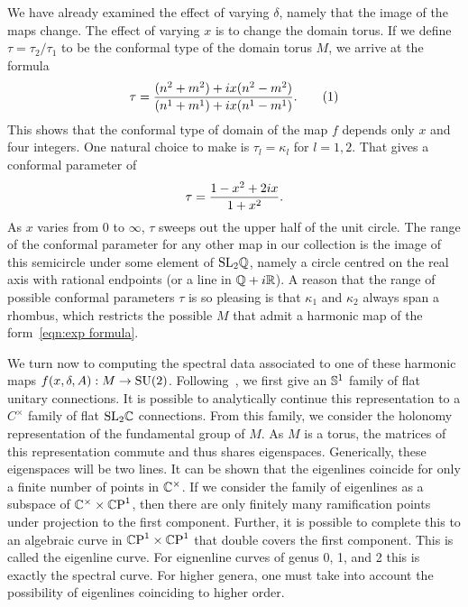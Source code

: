\documentclass{article}
\begin{document}
We have already examined the effect of varying $\delta$, namely that the image of the maps change. The effect of varying $x$ is to change the domain torus. If we define $\tau = \tau_2/\tau_1$ to be the conformal type of the domain torus $M$, we arrive at the formula
\[
\tau
= \frac{(n^2 + m^2) + \iu x(n^2 - m^2)}
{(n^1+m^1) +\iu x(n^1-m^1)}.
\labelthis{eqn:conformal type}
\]
This shows that the conformal type of domain of the map $f$ depends only $x$ and four integers. One natural choice to make is $\tau_l=\kappa_l$ for $l=1,2$. That gives a conformal parameter of 
\[
\tau = \frac{1-x^2 + 2\iu x}{1+x^2}.
\]
As $x$ varies from $0$ to $\infty$, $\tau$ sweeps out the upper half of the unit circle. The range of the conformal parameter for any other map in our collection is the image of this semicircle under some element of $\SL_2\Q$, namely a circle centred on the real axis with rational endpoints (or a line in $\Q+\iu\R$).
A reason that the range of possible conformal parameters $\tau$ is so pleasing is that $\kappa_1$ and $\kappa_2$ always span a rhombus, which restricts the possible $M$ that admit a harmonic map of the form~\eqref{eqn:exp formula}.





We turn now to computing the spectral data associated to one of these harmonic maps $f(x,\delta,A): M \to \SU(2)$. Following~\cite{Hitchin1990}, we first give an $\S^1$ family of flat unitary connections. It is possible to analytically continue this representation to a $C^\times$ family of flat $\SL_2\C$ connections. From this family, we consider the holonomy representation of the fundamental group of $M$. As $M$ is a torus, the matrices of this representation commute and thus shares eigenspaces. Generically, these eigenspaces will be two lines. It can be shown that the eigenlines coincide for only a finite number of points in $\C^\times$. If we consider the family of eigenlines as a subspace of $\C^\times \times \CP^1$, then there are only finitely many ramification points under projection to the first component. Further, it is possible to complete this to an algebraic curve in $\CP^1 \times \CP^1$ that double covers the first component. This is called the eigenline curve. For eignenline curves of genus 0, 1, and 2 this is exactly the spectral curve. For higher genera, one must take into account the possibility of eigenlines coinciding to higher order.
\end{document}
